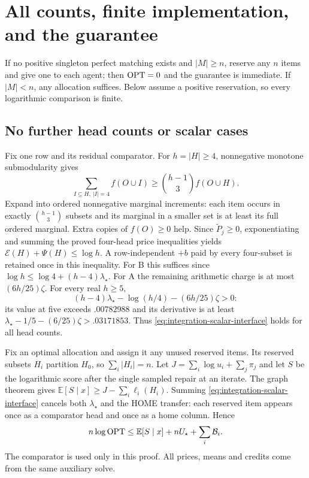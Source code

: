 \section{All counts, finite implementation, and the guarantee}\label{simp:finite}

If no positive singleton perfect matching exists and $|M|\ge n$, reserve
any $n$ items and give one to each agent; then $\operatorname{OPT}=0$ and the guarantee
is immediate. If $|M|<n$, any allocation suffices. Below assume a positive
reservation, so every logarithmic comparison is finite.

\subsection{No further head counts or scalar cases}

Fix one row and its residual comparator. For $h=|H|\ge4$, nonnegative
monotone submodularity gives
\[
 \sum_{I\subseteq H,\ |I|=4}f(O\cup I)
                         \ge {h-1\choose3}f(O\cup H).
\]
Expand into ordered nonnegative marginal increments: each item occurs in
exactly ${h-1\choose3}$ subsets and its marginal in a smaller set is at
least its full ordered marginal. Extra copies of $f(O)\ge0$ help.
Since $\widetilde P_j\ge0$, exponentiating and summing the proved four-head
price inequalities yields
$\mathcal E(H)+\Psi(H)\le\log h$. A row-independent $+b$ paid by every
four-subset is retained once in this inequality.
For B this suffices since $\log h\le\log4+(h-4)\lambda_\star$.
For A the remaining arithmetic charge is at most $(6h/25)\zeta$.
For every real $h\ge5$,
\[
 (h-4)\lambda_\star-\log(h/4)-(6h/25)\zeta>0:
\]
its value at five exceeds $.00782988$ and its derivative is at least
$\lambda_\star-1/5-(6/25)\zeta>.03171853$.
Thus \eqref{eq:integration-scalar-interface} holds for all head counts.

Fix an optimal allocation and assign it any unused reserved items.
Its reserved subsets $H_i$ partition $H_0$, so $\sum_i|H_i|=n$.
Let $J=\sum_i\log u_i+\sum_j\pi_j$ and let $S$ be the logarithmic
score after the single sampled repair at an iterate. The graph theorem gives
$\mathbb E[S\mid x]\ge J-\sum_i\ell_i(H_i)$.
Summing \eqref{eq:integration-scalar-interface} cancels both
$\lambda_\star$ and the HOME transfer: each reserved item appears once
as a comparator head and once as a home column. Hence
\begin{equation}\label{simp:iterate-bound}
 n\log\operatorname{OPT}\le\mathbb E[S\mid x]+nU_\star+\sum_i\mathcal B_i.
\end{equation}
The comparator is used only in this proof. All prices, means and credits
come from the same auxiliary solve.

